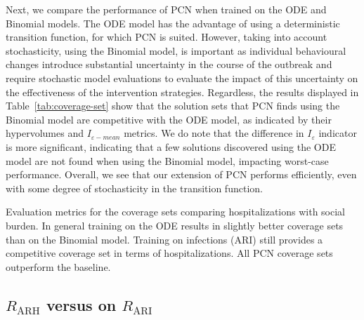 \documentclass{article}
\begin{document}
Next, we compare the performance of PCN when trained on the ODE and Binomial models. The ODE model has the advantage of using a deterministic transition function, for which PCN is suited. However, taking into account stochasticity, using the Binomial model, is important as individual behavioural changes introduce substantial uncertainty in the course of the outbreak and require stochastic model evaluations to evaluate the impact of this uncertainty on the effectiveness of the intervention strategies. Regardless, the results displayed in Table~\ref{tab:coverage-set} show that the solution sets that PCN finds using the Binomial model are competitive with the ODE model, as indicated by their hypervolumes and $I_{\varepsilon-mean}$ metrics. We do note that the difference in $I_{\varepsilon}$ indicator is more significant, indicating that a few solutions discovered using the ODE model are not found when using the Binomial model, impacting worst-case performance. Overall, we see that our extension of PCN performs efficiently, even with some degree of stochasticity in the transition function.


\begin{table}[t]
  \centering
  \setlength{\tabcolsep}{0.5em} %
  {\renewcommand{\arraystretch}{1.2}%
  
  }
  \caption{Evaluation metrics for the coverage sets comparing hospitalizations with social burden. In general training on the ODE results in slightly better coverage sets than on the Binomial model. Training on infections (ARI) still provides a competitive coverage set in terms of hospitalizations. All PCN coverage sets outperform the baseline.}
  \label{tab:coverage-set}
\end{table}

\subsection{$R_\text{ARH}$ versus on $R_\text{ARI}$}
\label{sec:arh-vs-ari}
\end{document}
